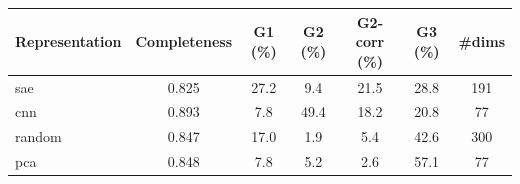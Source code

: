 \begin{tabular}{lcccccc}
\toprule
Representation & Completeness & G1 (\%) & G2 (\%) & G2-corr (\%) & G3 (\%) & \#dims \\
\midrule
sae & 0.825 & 27.2 & 9.4 & 21.5 & 28.8 & 191 \\
cnn & 0.893 & 7.8 & 49.4 & 18.2 & 20.8 & 77 \\
random & 0.847 & 17.0 & 1.9 & 5.4 & 42.6 & 300 \\
pca & 0.848 & 7.8 & 5.2 & 2.6 & 57.1 & 77 \\
\bottomrule
\end{tabular}